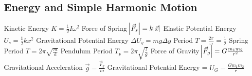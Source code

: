 \documentclass[11pt]{article}
\begin{document}
    \subsection{Energy and Simple Harmonic Motion}
    Kinetic Energy $K = \frac{1}{2}I\omega^{2}$\newline
    Force of Spring $\abs{\vec{F}_{s}} = k\abs{\vec{x}}$\newline
    Elastic Potential Energy $U_{s} = \frac{1}{2}kx^{2}$\newline
    Gravitational Potential Energy $\Delta U_{g} = mg\Delta y$\newline
    Period $T = \frac{2\pi}{\omega} = \frac{1}{2}$\newline
    Spring Period $T = 2\pi \sqrt{\frac{m}{k}}$\newline
    Pendulum Period $T_{p}=2\pi\sqrt{\frac{l}{g}}$\newline
    Force of Gravity $\abs {\vec{F}_{g}}= G \frac {m_{1}m_{2}}{r^{2}}$\newline
    Gravitational Acceleration $\vec{g} = \frac{\vec{F}_{g}}{m}$\newline
    Gravitational Potential Energy = $U_{G} = \frac{Gm_{1}m_{2}}{r}$\newline
\end{document}
